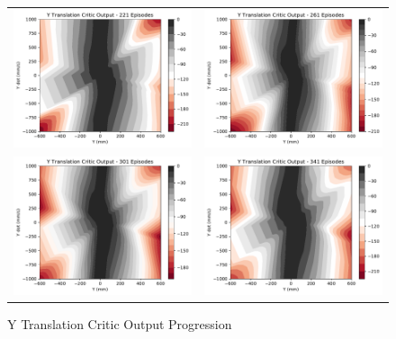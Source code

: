 \begin{figure}[H]
\begin{tabular}{cc}
		\includegraphics[width=65mm]{figures/train_figs/transy_critic/Critic2_221.pdf} &   \includegraphics[width=65mm]{figures/train_figs/transy_critic/Critic2_261.pdf} \\
		\includegraphics[width=65mm]{figures/train_figs/transy_critic/Critic2_301.pdf} &   \includegraphics[width=65mm]{figures/train_figs/transy_critic/Critic2_341.pdf} \\
	\end{tabular}
	\caption{Y Translation Critic Output Progression}\label{fig:y_critic_contour}
\end{figure}

